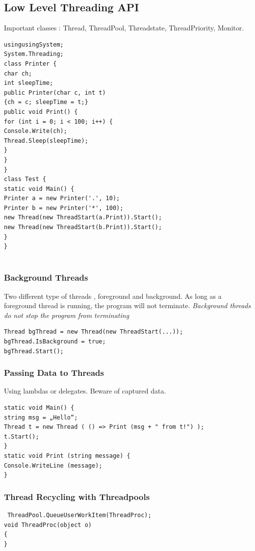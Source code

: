 \documentclass[a4paper,10pt]{scrartcl}
\begin{document}
\subsection{Low Level Threading API}
Important classes : Thread, ThreadPool, Threadstate, ThreadPriority, Monitor.
\begin{lstlisting}[caption=Simple Thread Example]
usingusingSystem;
System.Threading;
class Printer {
char ch;
int sleepTime;
public Printer(char c, int t)
{ch = c; sleepTime = t;}
public void Print() {
for (int i = 0; i < 100; i++) {
Console.Write(ch);
Thread.Sleep(sleepTime);
}
}
}
class Test {
static void Main() {
Printer a = new Printer('.', 10);
Printer b = new Printer('*', 100);
new Thread(new ThreadStart(a.Print)).Start();
new Thread(new ThreadStart(b.Print)).Start();
}
}
 
\end{lstlisting}

\subsubsection{Background Threads}
Two different type of threads , foreground and background. As long as a foreground thread is running, the program will not terminate. \textit{Background threads do not stop the program from terminating}
\begin{lstlisting}[caption=background thread example]
 Thread bgThread = new Thread(new ThreadStart(...));
bgThread.IsBackground = true;
bgThread.Start();

\end{lstlisting}

\subsubsection{Passing Data to Threads}
Using lambdas or delegates. Beware of captured data. 
\begin{lstlisting}[caption=data passing low level thread]
 static void Main() {
string msg = „Hello“;
Thread t = new Thread ( () => Print (msg + " from t!") );
t.Start();
}
static void Print (string message) {
Console.WriteLine (message);
}

\end{lstlisting}

\subsubsection{Thread Recycling with Threadpools}
\begin{lstlisting}
 ThreadPool.QueueUserWorkItem(ThreadProc);
void ThreadProc(object o)
{
}

\end{lstlisting}
\end{document}
